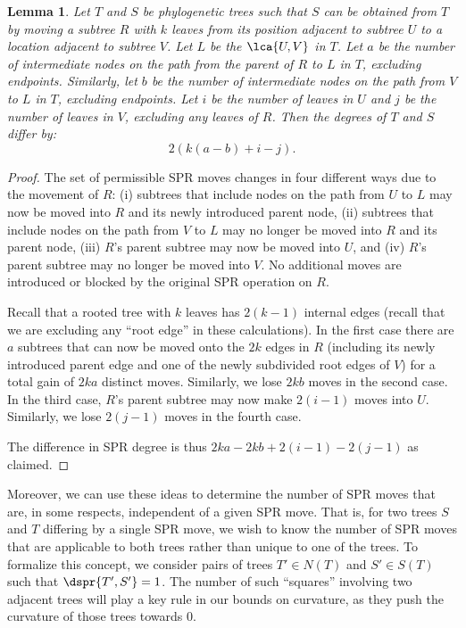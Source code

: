 \documentclass{amsart}
\newtheorem{lemma}[theorem]{Lemma}
\begin{document}
\begin{lemma}
\label{lem:degree_change}
Let $T$ and $S$ be phylogenetic trees such that $S$ can be obtained from $T$ by moving a subtree $R$ with $k$ leaves from its position adjacent to subtree $U$ to a location adjacent to subtree $V$.
Let $L$ be the $\lca{U,V}$ in $T$.
Let $a$ be the number of intermediate nodes on the path from the parent of $R$ to $L$ in $T$, excluding endpoints.
Similarly, let $b$ be the number of intermediate nodes on the path from $V$ to $L$ in $T$, excluding endpoints.
Let $i$ be the number of leaves in $U$ and $j$ be the number of leaves in $V$, excluding any leaves of $R$.
Then the degrees of $T$ and $S$ differ by:
$$2\left(k(a-b) + i - j\right).$$

\end{lemma}
\begin{proof}
The set of permissible SPR moves changes in four different ways due to the movement of $R$:
(i) subtrees that include nodes on the path from $U$ to $L$ may now be moved into $R$ and its newly introduced parent node,
(ii) subtrees that include nodes on the path from $V$ to $L$ may no longer be moved into $R$ and its parent node,
(iii) $R$'s parent subtree may now be moved into $U$, and
(iv) $R$'s parent subtree may no longer be moved into $V$.
No additional moves are introduced or blocked by the original SPR operation on $R$.

Recall that a rooted tree with $k$ leaves has $2(k-1)$ internal edges (recall that we are excluding any ``root edge'' in these calculations).
In the first case there are $a$ subtrees that can now be moved onto the $2k$ edges in $R$ (including its newly introduced parent edge and one of the newly subdivided root edges of $V$) for a total gain of $2ka$ distinct moves.
Similarly, we lose $2kb$ moves in the second case.
In the third case, $R$'s parent subtree may now make $2(i-1)$ moves into $U$.
Similarly, we lose $2(j-1)$ moves in the fourth case.

The difference in SPR degree is thus $2ka - 2kb + 2(i-1) - 2(j-1)$ as claimed.
\end{proof}

Moreover, we can use these ideas to determine the number of SPR moves that are, in some respects, independent of a given SPR move.
That is, for two trees $S$ and $T$ differing by a single SPR move, we wish to know the number of SPR moves that are applicable to both trees rather than unique to one of the trees.
To formalize this concept, we consider pairs of trees $T' \in N(T)$ and $S' \in S(T)$ such that $\dspr{T',S'} = 1$.
The number of such ``squares'' involving two adjacent trees will play a key rule in our bounds on curvature, as they push the curvature of those trees towards 0.
\end{document}
